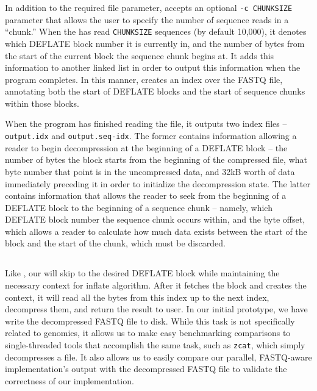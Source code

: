 In addition to the required \gzip file parameter, \ibuilder accepts an
optional \texttt{-c CHUNKSIZE} parameter that allows the user to specify the
number of sequence reads in a ``chunk.'' When the \ibuilder has read
\texttt{CHUNKSIZE} sequences (by default 10,000), it denotes which DEFLATE block
number it is currently in, and the number of bytes from the start of the current
block the sequence chunk begins at. It adds this information to another linked
list in order to output this information when the program completes. In this
manner, \ibuilder creates an index over the \gzip FASTQ file, annotating both
the start of \gzip DEFLATE blocks and the start of sequence chunks within those
blocks. 

When the \ibuilder program has finished reading the file, it outputs two index
files -- \texttt{output.idx} and \texttt{output.seq-idx}. The former contains
information allowing a reader to begin decompression at the beginning of a
DEFLATE block -- the number of bytes the block starts from the beginning of the
compressed file, what byte number that point is in the uncompressed data, and
32kB worth of data immediately preceding it in order to initialize the
decompression state. The latter contains information that allows the reader to
seek from the beginning of a DEFLATE block to the beginning of a sequence chunk
-- namely, which DEFLATE block number the sequence chunk occurs within, and the
byte offset, which allows a reader to calculate how much data exists between the
start of the block and the start of the chunk, which must be discarded.

\subsection{\ireader}
\label{sec:ireader}

Like \zran, our \ireader will skip to the desired DEFLATE block while
maintaining the necessary context for inflate algorithm. After it fetches the
block and creates the context, it will read all the bytes from this index up to
the next index, decompress them, and return the result to user. In our initial
prototype, we have \ireader write the decompressed FASTQ file to disk. While
this task is not specifically related to genomics, it allows us to make easy
benchmarking comparisons to single-threaded tools that accomplish the same task,
such as \texttt{zcat}, which simply decompresses a \gzip file. It also allows
us to easily compare our parallel, FASTQ-aware \ireader implementation's output
with the decompressed FASTQ file to validate the correctness of our
implementation.

